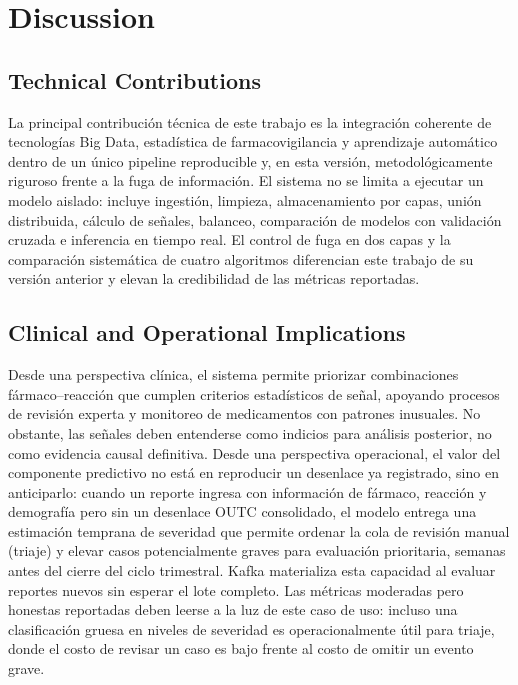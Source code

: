 \documentclass[12pt,a4paper]{article}
\begin{document}
\section{Discussion}

\subsection{Technical Contributions}
La principal contribución técnica de este trabajo es la integración coherente de tecnologías Big Data, estadística de farmacovigilancia y aprendizaje automático dentro de un único pipeline reproducible y, en esta versión, metodológicamente riguroso frente a la fuga de información. El sistema no se limita a ejecutar un modelo aislado: incluye ingestión, limpieza, almacenamiento por capas, unión distribuida, cálculo de señales, balanceo, comparación de modelos con validación cruzada e inferencia en tiempo real. El control de fuga en dos capas y la comparación sistemática de cuatro algoritmos diferencian este trabajo de su versión anterior y elevan la credibilidad de las métricas reportadas.

\subsection{Clinical and Operational Implications}
Desde una perspectiva clínica, el sistema permite priorizar combinaciones fármaco--reacción que cumplen criterios estadísticos de señal, apoyando procesos de revisión experta y monitoreo de medicamentos con patrones inusuales. No obstante, las señales deben entenderse como indicios para análisis posterior, no como evidencia causal definitiva. Desde una perspectiva operacional, el valor del componente predictivo no está en reproducir un desenlace ya registrado, sino en anticiparlo: cuando un reporte ingresa con información de fármaco, reacción y demografía pero sin un desenlace OUTC consolidado, el modelo entrega una estimación temprana de severidad que permite ordenar la cola de revisión manual (triaje) y elevar casos potencialmente graves para evaluación prioritaria, semanas antes del cierre del ciclo trimestral. Kafka materializa esta capacidad al evaluar reportes nuevos sin esperar el lote completo. Las métricas moderadas pero honestas reportadas deben leerse a la luz de este caso de uso: incluso una clasificación gruesa en niveles de severidad es operacionalmente útil para triaje, donde el costo de revisar un caso es bajo frente al costo de omitir un evento grave.
\end{document}
